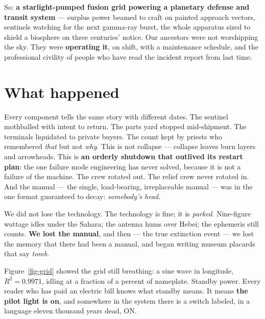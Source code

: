 \documentclass[
  english,
  11pt,
  letterpaper,
]{scrbook}
\begin{document}
So: \textbf{a starlight-pumped fusion grid powering a planetary defense
and transit system} --- surplus power beamed to craft on painted
approach vectors, sentinels watching for the next gamma-ray burst, the
whole apparatus sized to shield a biosphere on three centuries' notice.
Our ancestors were not worshipping the sky. They were \textbf{operating
it}, on shift, with a maintenance schedule, and the professional
civility of people who have read the incident report from last time.

\section{What happened}\label{what-happened}

Every component tells the same story with different dates. The sentinel
mothballed with intent to return. The parts yard stopped mid-shipment.
The terminals liquidated to private buyers. The count kept by priests
who remembered \emph{that} but not \emph{why}. This is not collapse ---
collapse leaves burn layers and arrowheads. This is \textbf{an orderly
shutdown that outlived its restart plan}: the one failure mode
engineering has never solved, because it is not a failure of the
machine. The crew rotated out. The relief crew never rotated in. And the
manual --- the single, load-bearing, irreplaceable manual --- was in the
one format guaranteed to decay: \emph{somebody's head}.

\begin{tcolorbox}[enhanced jigsaw, arc=.35mm, bottomrule=.15mm, bottomtitle=1mm, breakable, colback=white, colbacktitle=quarto-callout-warning-color!10!white, colframe=quarto-callout-warning-color-frame, coltitle=black, left=2mm, leftrule=.75mm, opacityback=0, opacitybacktitle=0.6, rightrule=.15mm, title=\textcolor{quarto-callout-warning-color}{\faExclamationTriangle}\hspace{0.5em}{The thesis, at volume}, titlerule=0mm, toprule=.15mm, toptitle=1mm]

We did not lose the technology. The technology is fine; it is
\emph{parked}. Nine-figure wattage idles under the Sahara; the antenna
hums over Hebei; the ephemeris still counts. \textbf{We lost the
manual}, and then --- the true extinction event --- we lost the memory
that there had been a manual, and began writing museum placards that say
\emph{tomb}.

\end{tcolorbox}

Figure~\ref{fig-grid} showed the grid still breathing: a sine wave in
longitude, \(R^2 = 0.9971\), idling at a fraction of a percent of
nameplate. Standby power. Every reader who has paid an electric bill
knows what standby means. It means \textbf{the pilot light is on}, and
somewhere in the system there is a switch labeled, in a language eleven
thousand years dead, ON.
\end{document}
